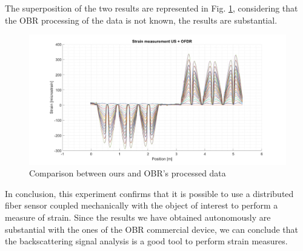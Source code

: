 The superposition of the two results are represented in Fig. \ref{fig:sovrapposizione}, considering that the OBR processing of the data is not known, the results are substantial.

\begin{figure}[H]
	\centering
	\includegraphics[scale=0.3]{img/sovrapposizione.png}
	\caption{Comparison between ours and OBR's processed data }\label{fig:sovrapposizione}
\end{figure}

In conclusion, this experiment confirms that it is possible to use a distributed fiber sensor coupled mechanically with the object of interest to perform a measure of strain. Since the results we have obtained autonomously are substantial with the ones of the OBR commercial device, we can conclude that the backscattering signal analysis is a good tool to perform strain measures.




